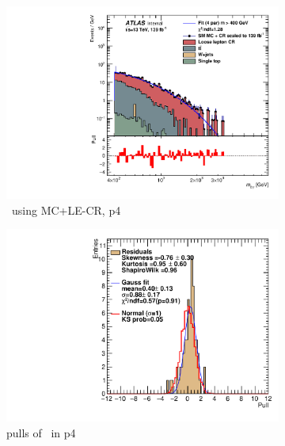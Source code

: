 \newpage

\begin{figure}[ht]
    \centering
    \begin{subfigure}[h]{0.38\linewidth}
    \includegraphics[scale=0.3]{figs/ch6/fit/variable_nosmooth/p4/1PB/output_SMMCplusCR_Mbg_p4.pdf}%
    \caption{\mbph \ using MC+LE-CR, p4}
    \end{subfigure}
    \hfill
    \begin{subfigure}[h]{0.4\linewidth}
    \includegraphics[scale=0.32]{figs/ch6/fit/variable_nosmooth/p4/1PB/pull_SMMCplusCR_Mbg_p4.pdf}%
    \caption{pulls of \mbph \ in p4}
    \end{subfigure}
    \hfill
    \begin{subfigure}[h]{0.38\linewidth}

\end{subfigure}
\end{figure}
